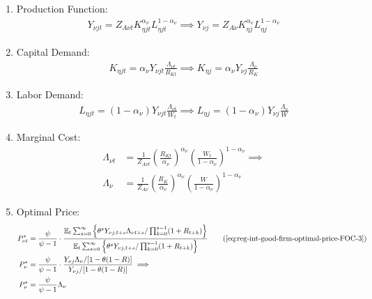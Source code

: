 \documentclass[
thesis.tex
]{subfiles}
\begin{document}
\begin{enumerate}
	\item Production Function:
	\begin{align}
		Y_{\nu jt} = Z_{A\nu t} K_{\eta jt}^{\alpha_\nu} L_{\eta jt}^{1-{\alpha_\nu}} \implies Y_{\nu j} = Z_{A\nu} K_{\eta j}^{\alpha_\nu} L_{\eta j}^{1-{\alpha_\nu}} \label{eq:reg-ss-int-good-firm-production-function}
	\end{align}

	\item Capital Demand:
	\begin{align}
		K_{\eta jt} = {\alpha_\nu} Y_{\nu jt} \frac{\Lambda_{\nu t}}{R_{Kt}} \implies K_{\eta j} = {\alpha_\nu} Y_{\nu j} \frac{\Lambda_{\nu}}{R_K} \label{eq:reg-ss-int-good-firm-FOC-Kt}
	\end{align}
	
	\item Labor Demand:
	\begin{align}
		L_{\eta jt} = (1-{\alpha_\nu}) Y_{\nu jt} \frac{\Lambda_{\nu t}}{W_t} \implies L_{\eta j} = (1 -{\alpha_\nu}) Y_{\nu j} \frac{\Lambda_{\nu}}{W} \label{eq:reg-ss-int-good-firm-FOC-Lt}
	\end{align}

	\item Marginal Cost:
	\begin{align}
		\Lambda_{\nu t} &= \frac{1}{Z_{A\nu t}} \left( \frac{R_{Kt}}{{\alpha_\nu}} \right)^{{\alpha_\nu}} \left( \frac{W_t}{1-{\alpha_\nu}} \right)^{1-{\alpha_\nu}} \implies \nonumber \\
		\Lambda_{\nu} &= \frac{1}{Z_{A\nu}} \left( \frac{R_K}{{\alpha_\nu}} \right)^{{\alpha_\nu}} \left( \frac{W}{1-{\alpha_\nu}} \right)^{1-{\alpha_\nu}} \label{eq:reg-ss-int-good-firm-MC-2}
	\end{align}

	\item Optimal Price:
	\begin{alignat}{2}
		P_{\nu t}^\ast &= \frac{\psi}{\psi-1} \cdot \frac{\E \sum_{s=0}^{\infty} \left\{\theta^s Y_{\nu j,t+s} \Lambda_{\nu t+s} / \prod_{k=0}^{s-1}(1+R_{t+k}) \right\}} {\E \sum_{s=0}^{\infty} \left\{ \theta^s Y_{\nu j,t+s} / \prod_{k=0}^{s-1}(1+R_{t+k}) \right\}} \tag{\ref{eq:reg-int-good-firm-optimal-price-FOC-3}} \\
		P_{\nu}^\ast &= \frac{\psi}{\psi-1} \cdot \frac{ Y_{\nu j} \Lambda_{\nu} / [1-\theta(1-R)]} {Y_{\nu j} / [1-\theta(1-R)]} \implies \nonumber \\
		P_{\nu}^\ast &= \frac{\psi}{\psi-1} \Lambda_{\nu} \label{eq:reg-ss-int-good-firm-optimal-price-FOC-3}
	\end{alignat}


\end{enumerate}
\end{document}
